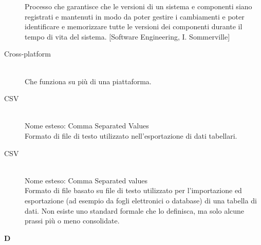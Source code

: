 \begin{description}
Processo che garantisce che le versioni di un sistema e	componenti siano registrati e mantenuti in modo da poter gestire i cambiamenti e poter identificare e memorizzare tutte le versioni dei componenti durante il tempo di vita del sistema. [Software Engineering, I. Sommerville]
 \item[Cross-platform] \hfill \\
Che funziona su più di una piattaforma.
 \item[CSV] \hfill \\
Nome esteso: Comma Separated Values\\ 
Formato di file di testo utilizzato nell'esportazione di dati tabellari.
 \item[CSV] \hfill \\
Nome esteso: Comma Separated values\\ 
Formato di file basato su file di testo utilizzato per l'importazione ed esportazione (ad esempio da fogli elettronici o database) di una tabella di dati. Non esiste uno standard formale che lo definisca, ma solo alcune prassi più o meno consolidate.
 \end{description}
\newpage 
\begin{center}\textbf{\Huge{D}}\end{center}
